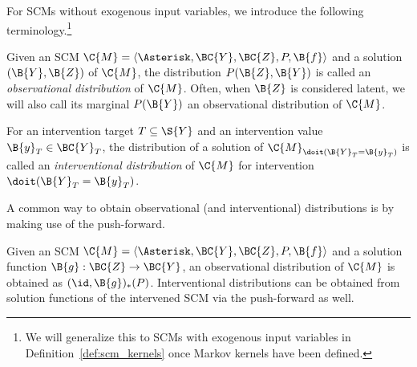 For SCMs without exogenous input variables, we introduce the following terminology.\footnote{We will generalize this to SCMs with exogenous input variables in Definition~\ref{def:scm_kernels} 
once Markov kernels have been defined.}
\begin{Def}\label{def:scm_distributions}
  Given an SCM $\C{M} = \langle \Asterisk, \BC{Y}, \BC{Z}, P, \B{f} \rangle$
  and a solution $(\B{Y},\B{Z})$ of $\C{M}$, the distribution
  $P(\B{Z},\B{Y})$ is called an \emph{observational distribution} of $\C{M}$.
  Often, when $\B{Z}$ is considered latent, we will also call its marginal
  $P(\B{Y})$ an observational distribution of $\C{M}$.

  For an intervention target $T \subseteq \S{Y}$ and an intervention value $\B{y}_T\in\BC{Y}_T$,
  the distribution of a solution of $\C{M}_{\doit(\B{Y}_T=\B{y}_T)}$ is called an
  \emph{interventional distribution} of $\C{M}$ for intervention $\doit(\B{Y}_T=\B{y}_T)$.
\end{Def}
A common way to obtain observational (and interventional) distributions is by making use of the push-forward.
\begin{Rem}
  Given an SCM $\C{M} = \langle \Asterisk, \BC{Y}, \BC{Z}, P, \B{f} \rangle$
  and a solution function $\B{g} : \BC{Z} \to \BC{Y}$, an observational distribution of $\C{M}$ is obtained as
  $(\id,\B{g})_*(P)$. Interventional distributions can be obtained from solution functions of the intervened SCM 
  via the push-forward as well.
\end{Rem}
%  

